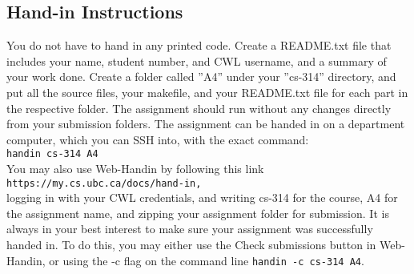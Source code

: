 \documentclass[12pt]{exam}
\begin{document}
\subsection{ Hand-in Instructions}
You do not have to hand in any printed code. Create a README.txt file that includes your name, student number, and CWL username, and a summary of your work done. Create a folder called ”A4” under your ”cs-314” directory, and put all the source files, your makefile, and your README.txt file for each part in the respective folder. The assignment should run without any changes directly from your submission folders. The assignment can be handed in on a department computer, which you can SSH into, with the exact command: \\
{ \tt handin cs-314 A4 }\\
 \newline
You may also use Web-Handin by following this link
\newline
{ \tt https://my.cs.ubc.ca/docs/hand-in, }
\newline \\
logging in with your CWL credentials, and writing cs-314 for the course, A4 for the assignment name, and zipping your assignment folder for submission.
It is always in your best interest to make sure your assignment was successfully handed in. To do this, you may either use the Check submissions button in Web-Handin,
or using the -c flag on the command line { \tt handin -c cs-314 A4}.
\end{document}

